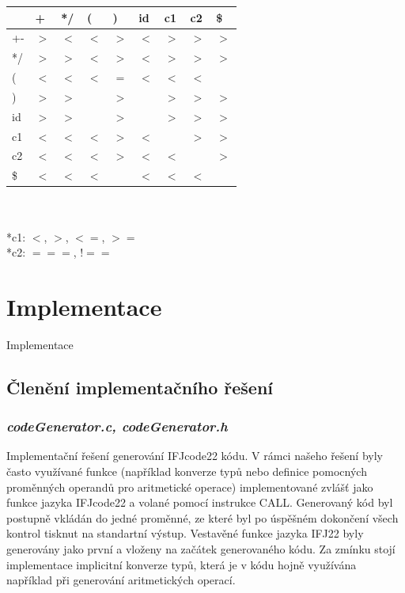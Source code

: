 \documentclass{article}
\begin{document}
 \begin{tabular}{|l|l|l|l|l|l|l|l|l|}
    \hline
                & + & */ & ( & ) & id & c1 & c2 & \$            \\
    \hline
    +- & $>$ &  $<$ &  $<$ &  $>$ &  $<$ &  $>$ &  $>$ &  $>$   \\
    \hline
    */ & $>$ &  $>$ &  $<$ &  $>$ &  $<$ &  $>$ &  $>$ &  $>$   \\
    \hline
    ( & $<$ &  $<$ &  $<$ &  $=$ &  $<$ &  $<$ &  $<$ &         \\
    \hline
    ) & $>$ &  $>$ &    &  $>$ &    &  $>$ &  $>$ &  $>$        \\
    \hline
    id & $>$ &  $>$ &    &  $>$ &    &  $>$ &  $>$ &  $>$       \\
    \hline
    c1 & $<$ &  $<$ &  $<$ &  $>$ &  $<$ &    &  $>$ &  $>$     \\
    \hline
    c2 & $<$ &  $<$ &  $<$ &  $>$ &  $<$ &  $<$ &    &  $>$     \\
    \hline
    \$ & $<$ &  $<$ &  $<$ &    &  $<$ &  $<$ &  $<$ &          \\
    \hline
 \end{tabular}\\\\
*c1: $<$, $>$, $<=$, $>=$\\
*c2: $===$, $!==$


\section{Implementace}

Implementace

\subsection{Členění implementačního řešení}


\subsubsection{\emph{codeGenerator.c, codeGenerator.h}}
Implementační řešení generování IFJcode22 kódu. V rámci našeho řešení byly často využívané funkce (například konverze typů nebo definice pomocných proměnných operandů pro aritmetické operace) implementované zvlášť jako funkce jazyka IFJcode22 a volané pomocí instrukce CALL. Generovaný kód byl postupně vkládán do jedné proměnné, ze které byl po úspěšném dokončení všech kontrol tisknut na standartní výstup. Vestavěné funkce jazyka IFJ22 byly generovány jako první a vloženy na začátek generovaného kódu. Za zmínku stojí implementace implicitní konverze typů, která je v kódu hojně využívána například při generování aritmetických operací.
\end{document}
